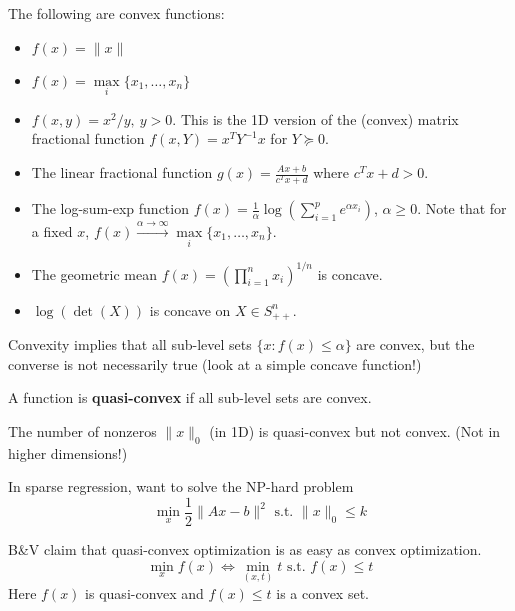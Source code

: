 \documentclass[english, 11pt]{article}
\begin{document}
\begin{exmp}
The following are convex functions:
\begin{itemize}
\item $f(x) = \|x\|$
\item $f(x) = \max \limits_i \{x_1,\dots,x_n\}$
\item $f(x,y) = x^2/y, \ y>0$. This is the 1D version of the (convex) matrix fractional function $f(x,Y) = x^T Y^{-1} x$ for $Y \succeq 0$.
\item The linear fractional function $g(x) = \frac{Ax+b}{c^Tx+d}$ where $c^T x + d >0$.
\item The log-sum-exp function $f(x) = \frac{1}{\alpha} \log \left( \sum_{i=1}^p e^{\alpha x_i} \right)$, $\alpha \ge 0$. Note that for a fixed $x$, $f(x) \xrightarrow{\alpha \to \infty} \max \limits_i \{x_1,\dots,x_n\}$.
\item The geometric mean $f(x) = \left( \prod_{i=1}^n x_i \right)^{1/n}$ is concave.
\item $\log(\det(X))$ is concave on $X \in S^n_{++}$.
\end{itemize}
\end{exmp}

\begin{rem}
Convexity implies that all sub-level sets $\{x : f(x) \le \alpha \}$ are convex, but the converse is not necessarily true (look at a simple concave function!)
\end{rem}


\begin{defn}
A function is {\bf quasi-convex} if all sub-level sets are convex.
\end{defn}

\begin{exmp}
The number of nonzeros $\|x\|_0$ (in 1D) is quasi-convex but not convex. (Not in higher dimensions!)
\end{exmp}

\begin{exmp}
In sparse regression, want to solve the NP-hard problem
\[
\min \limits_x \frac{1}{2} \|Ax-b\|^2 \text{ s.t. } \|x\|_0 \le k
\]
\end{exmp}

\begin{rem}
B\&V claim that quasi-convex optimization is as easy as convex optimization.
\[
\min \limits_x f(x) \iff \min \limits_{(x,t)} t \text{ s.t. } f(x) \le t
\]
Here $f(x)$ is quasi-convex and $f(x) \le t$ is a convex set.
\end{rem}
\end{document}
